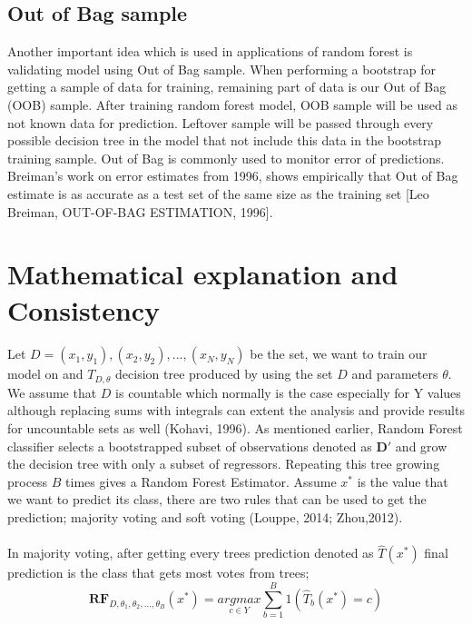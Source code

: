 \subsection {Out of Bag sample}
Another important idea which is used in applications of random forest is validating model using Out of Bag sample. When performing a bootstrap for getting a sample of data for training, remaining part of data is our Out of Bag (OOB) sample. After training random forest model, OOB sample will be used as not known data for prediction. Leftover sample will be passed through every possible decision tree in the model that not include this data in the bootstrap training sample. Out of Bag is commonly used to monitor error of predictions. Breiman’s work on error estimates from 1996, shows empirically that Out of Bag estimate is as accurate as a test set of the same size as the training set [Leo Breiman, OUT-OF-BAG ESTIMATION, 1996].


\section{Mathematical explanation and Consistency}
\paragraph{}
Let $D = {(x_{1},y_{1}), (x_{2}, y_{2}), ... , (x_{N}, y_{N})}$ be the set, we want to train our model on and $T_{D, \theta}$ decision tree produced by using the set $D$ and parameters $\theta$. We assume that $D$ is countable which normally is the case especially for Y values although replacing sums with integrals can extent the analysis and provide results for uncountable sets as well (Kohavi, 1996). As mentioned earlier, Random Forest classifier selects a bootstrapped subset of observations denoted as $\boldsymbol{D'}$ and grow the decision tree with only a subset of regressors. Repeating this tree growing process $B$ times gives a Random Forest Estimator. Assume $x^*$ is the value that we want to predict its class, there are two rules that can be used to get the prediction; majority voting and soft voting (Louppe, 2014; Zhou,2012).
\paragraph{}
In majority voting, after getting every trees prediction denoted as $\hat{T}(x^*)$ final prediction is the class that gets most votes from trees;
\begin{equation}
\boldsymbol{RF}_{D, \theta_{1}, \theta_{2}, ..., \theta_{B}} (x^*) =
	\underset{c \in Y}{argmax} \sum_{b = 1}^{B}{1(\hat{T}_{b}(x^*) = c)}
\end{equation}

